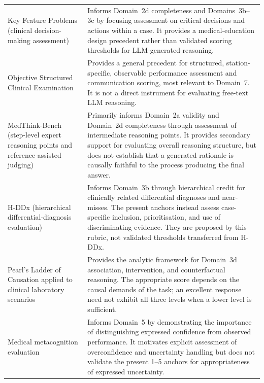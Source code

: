 \documentclass{article}
\begin{document}
{\begin{longtable}{p{}p{}}
Key Feature Problems
(clinical decision-making assessment)
\cite{page1995kfp}
&
Informs Domain~2d completeness and Domains~3b--3c by focusing
assessment on critical decisions and actions within a case. It provides
a medical-education design precedent rather than validated scoring
thresholds for LLM-generated reasoning.
\\

Objective Structured Clinical Examination
\cite{harden1975osce}
&
Provides a general precedent for structured, station-specific,
observable performance assessment and communication scoring, most
relevant to Domain~7. It is not a direct instrument for evaluating
free-text LLM reasoning.
\\

MedThink-Bench
(step-level expert reasoning points and reference-assisted judging)
\cite{zhou2026medthinkbench}
&
Primarily informs Domain~2a validity and Domain~2d completeness through
assessment of intermediate reasoning points. It provides secondary
support for evaluating overall reasoning structure, but does not
establish that a generated rationale is causally faithful to the
process producing the final answer.
\\

H-DDx
(hierarchical differential-diagnosis evaluation)
\cite{lim2025hddx}
&
Informs Domain~3b through hierarchical credit for clinically
related differential diagnoses and near-misses. The present
anchors instead assess case-specific inclusion, prioritisation,
and use of discriminating evidence. They are proposed by this
rubric, not validated thresholds transferred from H-DDx.
\\

Pearl's Ladder of Causation applied to clinical laboratory scenarios
\cite{bhasuran2025causal}
&
Provides the analytic framework for Domain~3d association,
intervention, and counterfactual reasoning. The appropriate score
depends on the causal demands of the task; an excellent response need
not exhibit all three levels when a lower level is sufficient.
\\

Medical metacognition evaluation
\cite{griot2025metacognition}
&
Informs Domain~5 by demonstrating the importance of distinguishing
expressed confidence from observed performance. It motivates explicit
assessment of overconfidence and uncertainty handling but does not
validate the present 1--5 anchors for appropriateness of expressed uncertainty.
\\


\end{longtable}}
\end{document}
